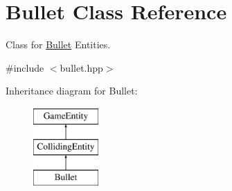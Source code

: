 \hypertarget{class_bullet}{}\section{Bullet Class Reference}
\label{class_bullet}


Class for \mbox{\hyperlink{class_bullet}{Bullet}} Entities.  




{\ttfamily \#include $<$bullet.\+hpp$>$}

Inheritance diagram for Bullet\+:\begin{figure}[H]
\begin{center}
\leavevmode
\includegraphics[height=3.000000cm]{class_bullet}
\end{center}
\end{figure}
